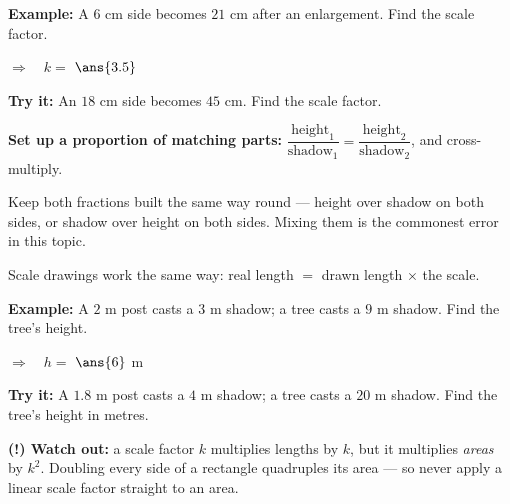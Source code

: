 \documentclass[12pt]{article}
\begin{document}
\begin{examplebox}
\textbf{Example:} \quad A $6$ cm side becomes $21$ cm after an enlargement. Find the scale factor.

$\Rightarrow\quad k = $ $\ans{3.5}$
\end{examplebox}

\begin{tryitbox}
\textbf{Try it:} \quad An $18$ cm side becomes $45$ cm. Find the scale factor.\\[2pt]
\end{tryitbox}


\begin{formulabox}
\textbf{Set up a proportion of matching parts:} $\dfrac{\text{height}_1}{\text{shadow}_1} = \dfrac{\text{height}_2}{\text{shadow}_2}$, and cross-multiply.\par
Keep both fractions built the same way round --- height over shadow on both sides, or shadow over height on both sides. Mixing them is the commonest error in this topic.\par
Scale drawings work the same way: real length $=$ drawn length $\times$ the scale.
\end{formulabox}

\begin{examplebox}
\textbf{Example:} \quad A $2$ m post casts a $3$ m shadow; a tree casts a $9$ m shadow. Find the tree's height.

$\Rightarrow\quad h = $ $\ans{6}$ m
\end{examplebox}

\begin{tryitbox}
\textbf{Try it:} \quad A $1.8$ m post casts a $4$ m shadow; a tree casts a $20$ m shadow. Find the tree's height in metres.\\[2pt]
\end{tryitbox}

\begin{watchoutbox}
\textbf{(!) Watch out:} a scale factor $k$ multiplies lengths by $k$, but it multiplies \emph{areas} by $k^2$. Doubling every side of a rectangle quadruples its area --- so never apply a linear scale factor straight to an area.
\end{watchoutbox}
\end{document}
